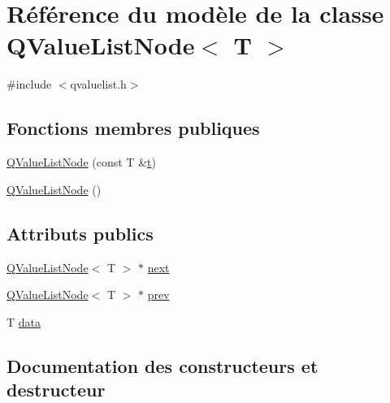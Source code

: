 \hypertarget{class_q_value_list_node}{}\section{Référence du modèle de la classe Q\+Value\+List\+Node$<$ T $>$}
\label{class_q_value_list_node}


{\ttfamily \#include $<$qvaluelist.\+h$>$}

\subsection*{Fonctions membres publiques}
\begin{DoxyCompactItemize}
\item 
\hyperlink{class_q_value_list_node_a414708bcc6bc42146b35152e149fd2e5}{Q\+Value\+List\+Node} (const T \&\hyperlink{058__bracket__recursion_8tcl_a69e959f6901827e4d8271aeaa5fba0fc}{t})
\item 
\hyperlink{class_q_value_list_node_ac1eb3b52bff20ed1c900274381bd94ad}{Q\+Value\+List\+Node} ()
\end{DoxyCompactItemize}
\subsection*{Attributs publics}
\begin{DoxyCompactItemize}
\item 
\hyperlink{class_q_value_list_node}{Q\+Value\+List\+Node}$<$ T $>$ $\ast$ \hyperlink{class_q_value_list_node_a1245a38c5c472b6867add6bfac379ff2}{next}
\item 
\hyperlink{class_q_value_list_node}{Q\+Value\+List\+Node}$<$ T $>$ $\ast$ \hyperlink{class_q_value_list_node_a2c968e12a5de6c529ea91cd10116c70c}{prev}
\item 
T \hyperlink{class_q_value_list_node_a3d4084886185c3f356bbd8e1009c3b7d}{data}
\end{DoxyCompactItemize}


\subsection{Documentation des constructeurs et destructeur}
\hypertarget{class_q_value_list_node_a414708bcc6bc42146b35152e149fd2e5}{}
